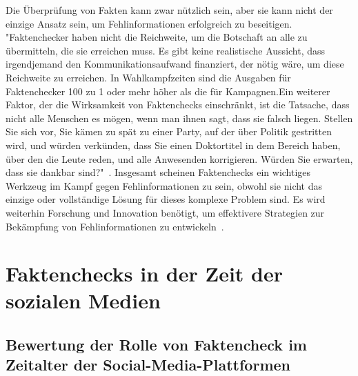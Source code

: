 \documentclass[a4paper,listof=totoc,bibliography=totoc]{scrartcl}
\begin{document}
Die Überprüfung von Fakten kann zwar nützlich sein, 
aber sie kann nicht der einzige Ansatz sein, um Fehlinformationen erfolgreich zu beseitigen. "Faktenchecker haben nicht die Reichweite, um die Botschaft an alle zu übermitteln, die 
sie erreichen muss. Es gibt keine realistische Aussicht, dass irgendjemand den Kommunikationsaufwand finanziert, der nötig wäre, um diese Reichweite zu erreichen. In Wahlkampfzeiten 
sind die Ausgaben für Faktenchecker 100 zu 1 oder mehr höher als die für Kampagnen.Ein weiterer Faktor, der die Wirksamkeit von Faktenchecks einschränkt, ist die Tatsache, dass 
nicht alle Menschen es mögen, wenn man ihnen sagt, dass sie falsch liegen. Stellen Sie sich vor, Sie kämen zu spät zu einer Party, auf der über Politik gestritten wird, und würden 
verkünden, dass Sie einen Doktortitel in dem Bereich haben, über den die Leute reden, und alle Anwesenden korrigieren. Würden Sie erwarten, dass sie dankbar sind?"~\cite{FullFact:2019}. 
Insgesamt scheinen Faktenchecks ein wichtiges Werkzeug im Kampf gegen Fehlinformationen zu sein, obwohl sie nicht das einzige oder vollständige Lösung für dieses 
komplexe Problem sind. Es wird weiterhin Forschung und Innovation benötigt, um effektivere Strategien zur Bekämpfung von Fehlinformationen zu entwickeln~\cite{lewandowsky2020}.

\section{Faktenchecks in der Zeit der sozialen Medien}

\subsection{Bewertung der Rolle von Faktencheck im Zeitalter der Social-Media-Plattformen}
\end{document}
